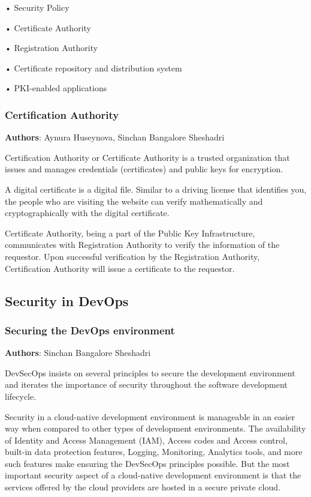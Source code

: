 •	Security Policy

•	Certificate Authority

•	Registration Authority

•	Certificate repository and distribution system

•	PKI-enabled applications

\subsubsection{Certification Authority}
\textbf{Authors}: Aynura Huseynova, Sinchan Bangalore Sheshadri

Certification Authority or Certificate Authority is a trusted organization that issues and manages credentials (certificates) and public keys for encryption.

A digital certificate is a digital file. Similar to a driving license that identifies you, the people who are visiting the website can verify mathematically and cryptographically with the digital certificate.

Certificate Authority, being a part of the Public Key Infrastructure, communicates with Registration Authority to verify the information of the requestor. Upon successful verification by the Registration Authority, Certification Authority will issue a certificate to the requestor.




\subsection{Security in DevOps}

\subsubsection{Securing the DevOps environment}
\textbf{Authors}: Sinchan Bangalore Sheshadri

DevSecOps insists on several principles to secure the development environment and iterates the importance of security throughout the software development lifecycle.

Security in a cloud-native development environment is manageable in an easier way when compared to other types of development environments. The availability of Identity and Access Management (IAM), Access codes and Access control, built-in data protection features, Logging, Monitoring, Analytics tools, and more such features make ensuring the DevSecOps principles possible. But the most important security aspect of a cloud-native development environment is that the services offered by the cloud providers are hosted in a secure private cloud.

